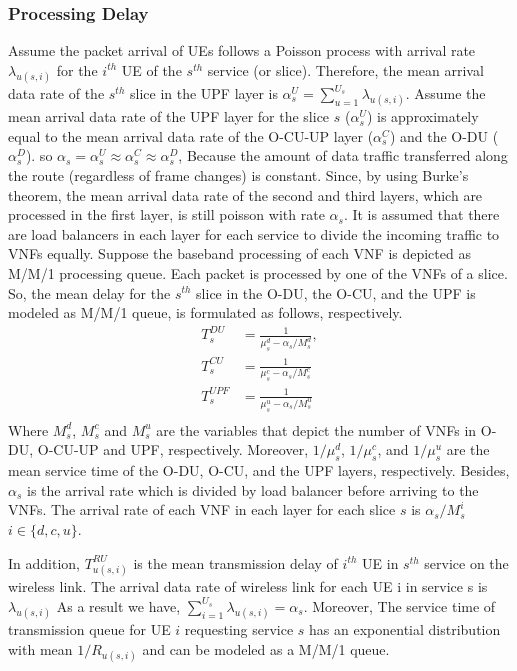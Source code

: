 \documentclass[conference]{IEEEtran}
\begin{document}
\subsubsection{Processing Delay}
Assume the packet arrival of UEs follows a Poisson process with arrival rate $\lambda_{u(s,i)}$ for the $i^{th}$ UE of the $s^{th}$ service (or slice).
Therefore, the mean arrival data rate of the $s^{th}$ slice in the UPF layer is $\alpha_{s}^U = \sum_{u=1}^{U_s}\lambda_{u(s,i)}$.
Assume the mean arrival data rate of the UPF layer for the slice $s$ ($\alpha_{s}^U$) is approximately equal to the mean arrival data rate of the O-CU-UP layer ($\alpha_{s}^C$) and the O-DU ($\alpha_{s}^D$). so $\alpha_{s} =\alpha_{s}^U \approx \alpha_{s}^C \approx \alpha_{s}^D$,
Because the amount of data traffic transferred along the route (regardless of frame changes) is constant.
Since, by using Burke’s theorem, the mean arrival data rate of the second and third layers, which are processed in the first layer, is still poisson with rate $\alpha_{s}$.
It is assumed that there are load balancers in each layer for each service to divide the incoming traffic to VNFs equally. %
Suppose the baseband processing of each VNF is depicted as M/M/1 processing queue.
Each packet is processed by one of the VNFs of a slice. So, the mean delay for the $s^{th}$ slice in the O-DU, the O-CU, and the UPF is modeled as M/M/1 queue, is formulated as follows, respectively.
\begin{equation}
\begin{split}
T_{s}^{DU} &= \frac{1}{\mu_s^d - \alpha_{s}/{M_s^{d}}},\\
T_{s}^{CU} &= \frac{1}{\mu_s^c - \alpha_{s}/{M_s^{c}}}\\
T_{s}^{UPF} &= \frac{1}{\mu_s^u - \alpha_{s}/{M_s^{u}}}\\
\end{split}
\end{equation}
Where $M_s^{d}$, $M_s^{c}$ and 
$M_s^{u}$ are the variables that depict the number of VNFs in O-DU, O-CU-UP and UPF, respectively. 
Moreover, $1/\mu_s^d$, $1/\mu_s^c$, and $1/\mu_s^u$ are the mean service time of the O-DU, O-CU, and the UPF layers, respectively.
Besides, $\alpha_{s}$ is the  arrival rate which is divided
by load balancer before arriving to the VNFs. The arrival rate of each VNF in each layer for each slice 
$s$ is $\alpha_{s}/{M_s^{i}}$ $ i \in \{d,c, u\}$.

In addition, $T_{u(s,i)}^{RU}$ is the mean transmission delay of $i^{th}$ UE in $s^{th}$ service on the wireless link.
 The arrival data rate of wireless link for each UE i in service s is $\lambda_{u(s,i)}$
As a result we have, $\sum_{i = 1}^{U_s} \lambda_{u(s,i)} = \alpha_s$.
Moreover, The service time of transmission queue for UE $i$ requesting service $s$ has
an exponential distribution with mean $1/R_{u(s,i)}$ and can be modeled as a M/M/1 queue.
 
\end{document}
